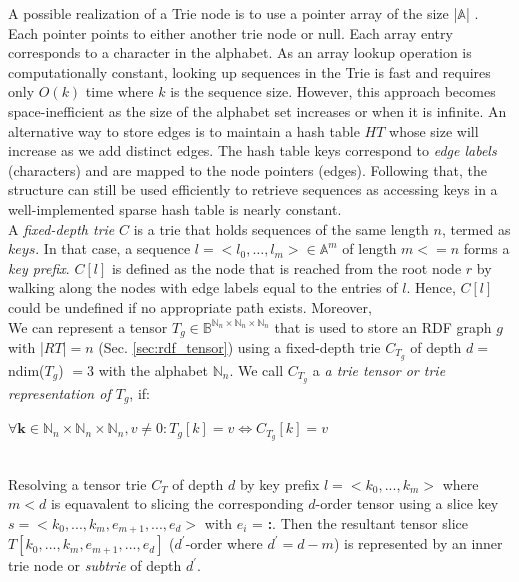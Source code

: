 A possible realization of a Trie node is to use a pointer array of the size |$\mathbb{A}$| \cite{Brass:2008:ADS:1434862}. Each pointer points to either another trie node or null. Each array entry corresponds to a character in the alphabet. As an array lookup operation is computationally constant, looking up sequences in the Trie is fast and requires only $O(k)$ time where $k$ is the sequence size. However, this approach becomes space-inefficient as the size of the alphabet set increases or when it is infinite. An alternative way to store edges is to maintain a hash table $HT$ whose size will increase as we add distinct edges. The hash table keys correspond to \textit{edge labels} (characters) and are mapped to the node pointers (edges). Following that, the structure can still be used efficiently to retrieve sequences as accessing keys in a well-implemented sparse hash table is nearly constant. \\ 

A \textit{fixed-depth trie} $C$ is a trie that holds sequences of the same length $n$, termed as $keys$. In that case, a sequence $l = <l_0, … , l_m> \in \mathbb{A}^m$ of length $m <= n$ forms a \textit{key prefix}. $C[l]$ is defined as the node that is reached from the root node $r$ by walking along the nodes with edge labels equal to the entries of $l$. Hence, $C[l]$ could be undefined if no appropriate path exists. Moreover, \\

We can represent a tensor $T_g \in \mathbb{B}^{\mathbb{N}_n \times \mathbb{N}_n \times \mathbb{N}_n}$ that is used to store an RDF graph $g$ with |$RT$|$=n$ (Sec. \ref{sec:rdf_tensor}) using a fixed-depth trie $C_{T_g}$ of depth $d = $ ndim($T_g$) $=3$ with the alphabet $\mathbb{N}_n$. We call $C_{T_g}$ a \textit{a trie tensor or trie representation of $T_g$}, if: \\
\centerline{$\forall \textbf{k} \in \mathbb{N}_n \times \mathbb{N}_n \times \mathbb{N}_n, v \neq 0: T_g[k] = v \iff C_{T_g}[k] = v$}\\

Resolving a tensor trie $C_T$ of depth $d$ by key prefix $l = <k_0, ..., k_m>$ where $m<d$ is equavalent to slicing the corresponding $d$-order tensor using a slice key $s = <k_0, ..., k_m, e_{m+1}, ...,e_d>$ with $e_i$ = \textbf{:}. Then the resultant tensor slice $T[k_0, ..., k_m, e_{m+1}, ...,e_d]$ ($d^{'}$-order where $d^{'}=d-m$) is represented by an inner trie node or \textit{subtrie} of depth $d^{'}$. \\


